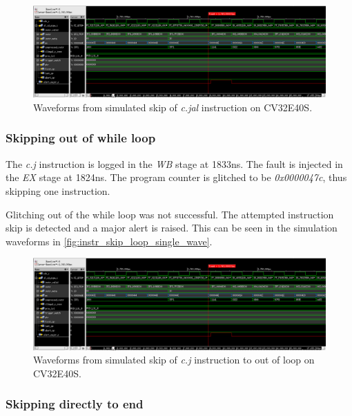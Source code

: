 \begin{figure}[h!]
    \centering
    \includegraphics[width=\textwidth]{docs/images/instr_skip_glitch_injection_single_core.png}
    \caption{Waveforms from simulated skip of \textit{c.jal} instruction on CV32E40S.}
    \label{fig:instr_skip_single_wave}
\end{figure}

\subsubsection{Skipping out of while loop}

The \textit{c.j} instruction is logged in the \textit{WB} stage at 1833ns. The fault is injected in the \textit{EX} stage at 1824ns. The program counter is glitched to be \textit{0x0000047c}, thus skipping one instruction.

Glitching out of the while loop was not successful. The attempted instruction skip is detected and a major alert is raised. This can be seen in the simulation waveforms in \autoref{fig:instr_skip_loop_single_wave}. 

\begin{figure}[h!]
    \centering
    \includegraphics[width=\textwidth]{docs/images/instr_skip_glitch_injection_single_core.png}
    \caption{Waveforms from simulated skip of \textit{c.j} instruction to out of loop on CV32E40S.}
    \label{fig:instr_skip_loop_single_wave}
\end{figure}

\subsubsection{Skipping directly to end}

